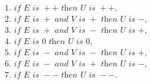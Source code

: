 \begin{equation*}
\begin{aligned}
    &\text{1. } \textit{if } E \textit{ is } ++ \textit{ then } U \textit{ is } ++, \\
    &\text{2. } \textit{if } E \textit{ is } + \textit{ and } V \textit{ is } + \textit{ then } U \textit{ is } -, \\
    &\text{3. } \textit{if } E \textit{ is } + \textit{ and } V \textit{ is } - \textit{ then } U \textit{ is } +, \\
    &\text{4. } \textit{if } E \textit{ is } 0 \textit{ then } U \textit{ is } 0, \\
    &\text{5. } \textit{if } E \textit{ is } - \textit{ and } V \textit{ is } - \textit{ then } U \textit{ is } +, \\
    &\text{6. } \textit{if } E \textit{ is } - \textit{ and } V \textit{ is } + \textit{ then } U \textit{ is } -, \\
    &\text{7. } \textit{if } E \textit{ is } -- \textit{ then } U \textit{ is } --.
\end{aligned}
\end{equation*}

